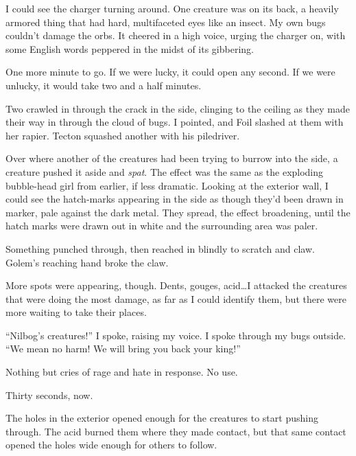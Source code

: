I could see the charger turning around.  One creature was on its back, a heavily armored thing that had hard, multifaceted eyes like an insect.  My own bugs couldn't damage the orbs.  It cheered in a high voice, urging the charger on, with some English words peppered in the midst of its gibbering.



One more minute to go.  If we were lucky, it could open any second.  If we were unlucky, it would take two and a half minutes.



Two crawled in through the crack in the side, clinging to the ceiling as they made their way in through the cloud of bugs.  I pointed, and Foil slashed at them with her rapier.  Tecton squashed another with his piledriver.



Over where another of the creatures had been trying to burrow into the side, a creature pushed it aside and \emph{spat}.  The effect was the same as the exploding bubble-head girl from earlier, if less dramatic.  Looking at the exterior wall, I could see the hatch-marks appearing in the side as though they'd been drawn in marker, pale against the dark metal.  They spread, the effect broadening, until the hatch marks were drawn out in white and the surrounding area was paler.



Something punched through, then reached in blindly to scratch and claw.  Golem's reaching hand broke the claw.



More spots were appearing, though.  Dents, gouges, acid\ldots  I attacked the creatures that were doing the most damage, as far as I could identify them, but there were more waiting to take their places.



``Nilbog's creatures!''  I spoke, raising my voice.  I spoke through my bugs outside.  ``We mean no harm!  We will bring you back your king!''



Nothing but cries of rage and hate in response.  No use.



Thirty seconds, now.



The holes in the exterior opened enough for the creatures to start pushing through.  The acid burned them where they made contact, but that same contact opened the holes wide enough for others to follow.



